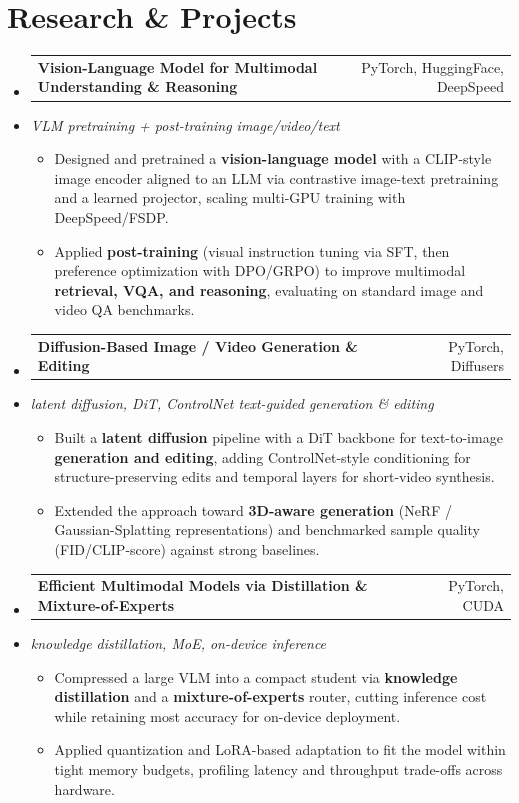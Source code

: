 \documentclass[letterpaper,10pt]{article}
\makeatletter
\newcommand{\resumeItem}[1]{
  \item\small{#1\vspace{-1pt}}
}
\newcommand{\resumeProjectHeading}[2]{
    \item
    \begin{tabular*}{0.985\textwidth}[t]{l@{\extracolsep{\fill}}r}
      \small\textbf{#1} & \small #2 \\
    \end{tabular*}\vspace{-5pt}
}
\newcommand{\resumeProjectSubheading}[1]{
  \vspace{-2pt}\item[] {\small\textcolor{ResumeSlate}{\emph{#1}}}\vspace{-3pt}
}
\newcommand{\resumeSubHeadingListStart}{\begin{itemize}[leftmargin=0.0in, label={}, itemsep=2pt, topsep=2pt]}
\newcommand{\resumeSubHeadingListEnd}{\end{itemize}}
\newcommand{\resumeItemListStart}{\begin{itemize}[leftmargin=0.18in, itemsep=2pt, topsep=1pt]}
\newcommand{\resumeItemListEnd}{\end{itemize}\vspace{-4pt}}
\makeatother
\begin{document}
\section{Research \& Projects}
\resumeSubHeadingListStart
  \resumeProjectHeading
    {Vision-Language Model for Multimodal Understanding \& Reasoning}
    {PyTorch, HuggingFace, DeepSpeed}
  \resumeProjectSubheading{VLM pretraining + post-training \enspace\textbar\enspace image/video/text}
    \resumeItemListStart
      \resumeItem{Designed and pretrained a \textbf{vision-language model} with a CLIP-style image encoder aligned to an LLM via contrastive image-text pretraining and a learned projector, scaling multi-GPU training with DeepSpeed/FSDP.}
      \resumeItem{Applied \textbf{post-training} (visual instruction tuning via SFT, then preference optimization with DPO/GRPO) to improve multimodal \textbf{retrieval, VQA, and reasoning}, evaluating on standard image and video QA benchmarks.}
    \resumeItemListEnd
  \resumeProjectHeading
    {Diffusion-Based Image / Video Generation \& Editing}
    {PyTorch, Diffusers}
  \resumeProjectSubheading{latent diffusion, DiT, ControlNet \enspace\textbar\enspace text-guided generation \& editing}
    \resumeItemListStart
      \resumeItem{Built a \textbf{latent diffusion} pipeline with a DiT backbone for text-to-image \textbf{generation and editing}, adding ControlNet-style conditioning for structure-preserving edits and temporal layers for short-video synthesis.}
      \resumeItem{Extended the approach toward \textbf{3D-aware generation} (NeRF / Gaussian-Splatting representations) and benchmarked sample quality (FID/CLIP-score) against strong baselines.}
    \resumeItemListEnd
  \resumeProjectHeading
    {Efficient Multimodal Models via Distillation \& Mixture-of-Experts}
    {PyTorch, CUDA}
  \resumeProjectSubheading{knowledge distillation, MoE, on-device inference}
    \resumeItemListStart
      \resumeItem{Compressed a large VLM into a compact student via \textbf{knowledge distillation} and a \textbf{mixture-of-experts} router, cutting inference cost while retaining most accuracy for on-device deployment.}
      \resumeItem{Applied quantization and LoRA-based adaptation to fit the model within tight memory budgets, profiling latency and throughput trade-offs across hardware.}
    \resumeItemListEnd
\resumeSubHeadingListEnd
\vspace{-4pt}
\end{document}
